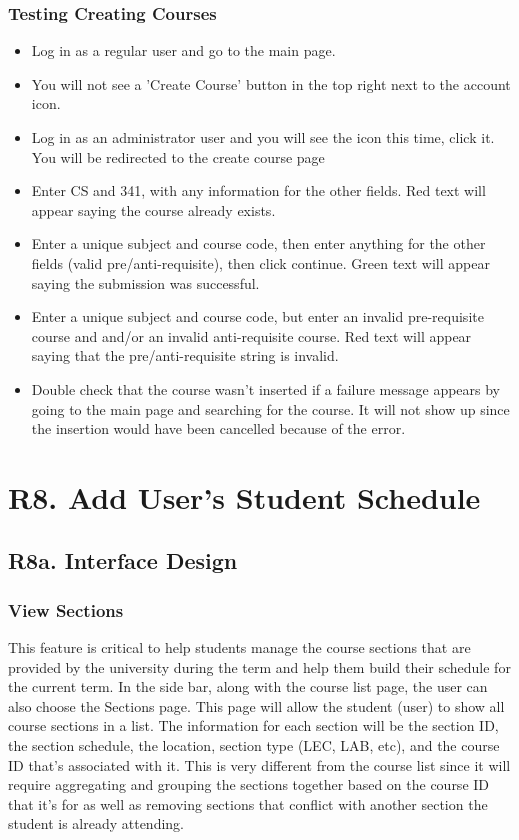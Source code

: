 \documentclass[12pt, a4paper]{article}
\begin{document}
\subsubsection*{Testing Creating Courses}
\begin{itemize}
    \item Log in as a regular user and go to the main page.
    \item You will not see a 'Create Course' button in the top right next to the account icon.
    \item Log in as an administrator user and you will see the icon this time, click it. You will be redirected to the create course page
    \item Enter CS and 341, with any information for the other fields. Red text will appear saying the course already exists.
    \item Enter a unique subject and course code, then enter anything for the other fields (valid pre/anti-requisite), then click continue. Green text will appear saying the submission was successful.
    \item Enter a unique subject and course code, but enter an invalid pre-requisite course and and/or an invalid anti-requisite course. Red text will appear saying that the pre/anti-requisite string is invalid.
    \item Double check that the course wasn't inserted if a failure message appears by going to the main page and searching for the course. It will not show up since the insertion would have been cancelled because of the error.
\end{itemize}
\section*{R8. Add User's Student Schedule}
\label{sec:R8}
\subsection*{R8a. Interface Design}
\subsubsection*{View Sections}
This feature is critical to help students manage the course sections that are provided by the university during the term and help them build their schedule for the current term. In the side bar, along with the course list page, the user can also choose the Sections page. This page will allow the student (user) to show all course sections in a list. The information for each section will be the section ID, the section schedule, the location, section type (LEC, LAB, etc), and the course ID that's associated with it. This is very different from the course list since it will require aggregating and grouping the sections together based on the course ID that it's for as well as removing sections that conflict with another section the student is already attending.
\end{document}
